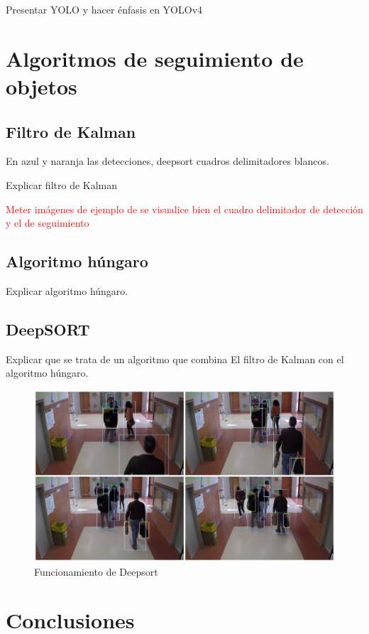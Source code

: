 Presentar YOLO y hacer énfasis en YOLOv4

\newpage

\section{Algoritmos de seguimiento de objetos}
\label{sec:tecnicas-utilizadas-tracking}

\subsection{Filtro de Kalman}
\label{subsec:kalman-filter}

En azul y naranja las detecciones, deepsort cuadros delimitadores blancos.

Explicar filtro de Kalman

\textcolor{red}{Meter imágenes de ejemplo de se visualice bien el cuadro delimitador de detección y el de seguimiento}

\newpage

\subsection{Algoritmo húngaro}
\label{subsec:hungarian-algorithm}

Explicar algoritmo húngaro.

\newpage

\subsection{DeepSORT}
\label{subsec:deepsort}

Explicar que se trata de un algoritmo que combina El filtro de Kalman con el algoritmo húngaro.

\begin{figure}[ht]
\centering
\includegraphics[width=1\textwidth]{img/chapters/algoritmos/deepsort-example.png}
\caption{\label{fig:tracking-example}Funcionamiento de Deepsort}
\end{figure}

\newpage

\section{Conclusiones}
\label{sec:conclu-sota}